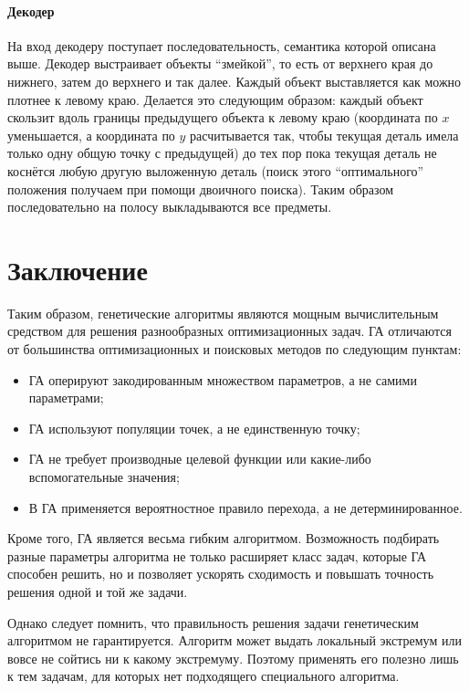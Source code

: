 \subsubsection{Декодер}

На вход декодеру поступает последовательность, семантика которой описана выше. Декодер выстраивает объекты ``змейкой'', то есть от верхнего края до нижнего, затем до верхнего и так далее. Каждый объект выставляется как можно плотнее к левому краю. Делается это следующим образом: каждый объект скользит вдоль границы предыдущего объекта к левому краю (координата по $x$ уменьшается, а координата по $y$ расчитывается так, чтобы текущая деталь имела только одну общую точку с предыдущей) до тех пор пока текущая деталь не коснётся любую другую выложенную деталь (поиск этого ``оптимального'' положения получаем при помощи двоичного поиска). Таким образом последовательно на полосу выкладываются все предметы. 

\chapter{Заключение}
Таким образом, генетические алгоритмы являются мощным вычислительным средством для решения разнообразных оптимизационных задач. ГА отличаются от большинства оптимизационных и поисковых методов по следующим пунктам:
\begin{itemize}
	\item ГА оперируют закодированным множеством параметров, а не самими параметрами;
	\item ГА используют популяции точек, а не единственную точку;
	\item ГА не требует производные целевой функции или какие-либо вспомогательные значения;
	\item В ГА применяется вероятностное правило перехода, а не детерминированное.
\end{itemize}

Кроме того, ГА является весьма гибким алгоритмом. Возможность подбирать разные параметры алгоритма не только расширяет класс задач, которые ГА способен решить, но и позволяет ускорять сходимость и повышать точность решения одной и той же задачи.

Однако следует помнить, что правильность решения задачи генетическим алгоритмом не гарантируется. Алгоритм может выдать локальный экстремум или вовсе не сойтись ни к какому экстремуму. Поэтому применять его полезно лишь к тем задачам, для которых нет подходящего специального алгоритма.

